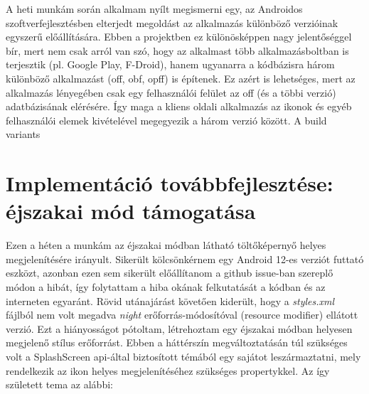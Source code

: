 A heti munkám során alkalmam nyílt megismerni egy, az Androidos szoftverfejlesztésben elterjedt
megoldást az alkalmazás különböző verzióinak egyszerű előállítására. Ebben a projektben ez
különösképpen nagy jelentőséggel bír, mert nem csak arról van szó, hogy az alkalmast több
alkalmazásboltban is terjesztik (pl. Google Play, F-Droid), hanem ugyanarra a kódbázisra
három különböző alkalmazást (\acrfull{off}, \acrfull{obf}, \acrfull{opff})
is építenek. Ez azért is lehetséges, mert az alkalmazás lényegében csak egy felhasználói felület
az \acrlong{off} (és a többi verzió) adatbázisának elérésére. Így maga a kliens oldali alkalmazás
az ikonok és egyéb felhasználói elemek kivételével megegyezik a három verzió között.
A build variants %


\section{Implementáció továbbfejlesztése: éjszakai mód támogatása}
Ezen a héten a munkám az éjszakai módban látható töltőképernyő helyes megjelenítésére irányult.
Sikerült kölcsönkérnem egy Android 12-es verziót futtató eszközt, azonban ezen sem sikerült
előállítanom a \gls{github} issue-ban szereplő módon a hibát, így folytattam a hiba okának felkutatását
a kódban és az interneten egyaránt. Rövid utánajárást követően kiderült, hogy a
\textit{styles.xml} fájlból nem volt megadva \textit{night} erőforrás-módosítóval
(resource modifier) ellátott verzió. Ezt a hiányosságot pótoltam, létrehoztam egy éjszakai
módban helyesen megjelenő stílus erőforrást. Ebben a háttérszín megváltoztatásán túl szükséges
volt a SplashScreen \acrshort{api}-által biztosított témából egy sajátot leszármaztatni, mely rendelkezik
az ikon helyes megjelenítéséhez szükséges propertykkel. Az így született \gls{tema} az alábbi:

